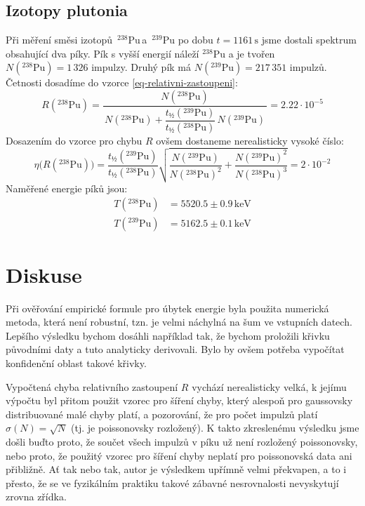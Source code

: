 \documentclass[10pt,a4paper]{article}
\renewcommand{\U}[1]{\ensuremath{\,\mathrm{#1}}}
\newcommand{\°}{\degree}
\begin{document}
\subsection{Izotopy plutonia}
Při měření směsi izotopů $\,{}^{238}$Pu\;\,a $\,{}^{239}$Pu po dobu $t=1161 \U{s}$ jsme dostali spektrum obsahující dva píky. Pík s vyšší energií náleží $^{238}$Pu a je tvořen $N({}^{238}\text{Pu}) = 1\,326$ impulzy. Druhý pík má $N({}^{239}\text{Pu}) = 217\,351$ impulzů. Četnosti dosadíme do vzorce \eqref{eq-relativni-zastoupeni}:
\begin{equation*}
    R({}^{238}\text{Pu})
    = \frac{N({}^{238}\text{Pu})}{\, N({}^{238}\text{Pu}) +  \dfrac{t_½({}^{239}\text{Pu})}{t_½({}^{238}\text{Pu})} \, N({}^{239}\text{Pu}) \,}
    = 2.22 \cdot 10^{-5}
\end{equation*}
Dosazením do vzorce pro chybu $R$ ovšem dostaneme nerealisticky vysoké číslo:
\begin{equation*}
    \eta\big(R({}^{238}\text{Pu})\big)
    = \frac{t_½({}^{239}\text{Pu})}{t_½({}^{238}\text{Pu})}
    \sqrt{\frac{N({}^{239}\text{Pu})}{N({}^{238}\text{Pu})^2} + \frac{N({}^{239}\text{Pu})^2}{N({}^{238}\text{Pu})^3}}
    = 2 \cdot 10^{-2}
\end{equation*}
Naměřené energie píků jsou:
\begin{align*}
    T({}^{238}\text{Pu}) &= 5520.5 \pm 0.9 \U{keV} \\
    T({}^{239}\text{Pu}) &= 5162.5 \pm 0.1 \U{keV}
\end{align*}



\section{Diskuse}
Při ověřování empirické formule pro úbytek energie byla použita numerická metoda, která není robustní, tzn. je velmi náchylná na šum ve vstupních datech. Lepšího výsledku bychom dosáhli například tak, že bychom proložili křivku původními daty a tuto analyticky derivovali. Bylo by ovšem potřeba vypočítat konfidenční oblast takové křivky.

Vypočtená chyba relativního zastoupení $R$ vychází nerealisticky velká, k jejímu výpočtu byl přitom použit vzorec pro šíření chyby, který alespoň pro gaussovsky distribuované malé chyby platí, a pozorování, že pro počet impulzů platí $\sigma(N) = \sqrt{N}$ (tj. je poissonovsky rozložený). K takto zkreslenému výsledku jsme došli buďto proto, že součet všech impulzů v píku už není rozložený poissonovsky, nebo proto, že použitý vzorec pro šíření chyby neplatí pro poissonovská data ani přibližně. Ať tak nebo tak, autor je výsledkem upřímně velmi překvapen, a to i přesto, že se ve fyzikálním praktiku takové zábavné nesrovnalosti nevyskytují zrovna zřídka.
\end{document}
